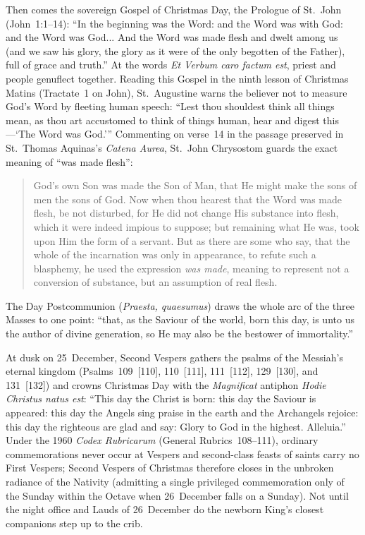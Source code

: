 Then comes the sovereign Gospel of Christmas Day, the Prologue of St.~John
(John~1:1--14): ``In the beginning was the Word: and the Word was with God: and
the Word was God... And the Word was made flesh and dwelt among us (and we saw
his glory, the glory as it were of the only begotten of the Father), full of
grace and truth.'' At the words \textit{Et Verbum caro factum est}, priest and
people genuflect together. Reading this Gospel in the ninth lesson of Christmas
Matins (Tractate~1 on John), St.~Augustine warns the believer not to measure
God's Word by fleeting human speech: ``Lest thou shouldest think all things
mean, as thou art accustomed to think of things human, hear and digest
this---`The Word was God.''' Commenting on verse~14 in the passage preserved in
St.~Thomas Aquinas's \textit{Catena Aurea}, St.~John Chrysostom guards the
exact meaning of ``was made flesh'':

\begin{quote}
God's own Son was made the Son of Man, that He might make the sons of men the
sons of God. Now when thou hearest that the Word was made flesh, be not
disturbed, for He did not change His substance into flesh, which it were indeed
impious to suppose; but remaining what He was, took upon Him the form of a
servant. But as there are some who say, that the whole of the incarnation was
only in appearance, to refute such a blasphemy, he used the expression
\textit{was made}, meaning to represent not a conversion of substance, but an
assumption of real flesh.
\end{quote}

The Day Postcommunion (\textit{Praesta, quaesumus}) draws the whole arc of the
three Masses to one point: ``that, as the Saviour of the world, born this day,
is unto us the author of divine generation, so He may also be the bestower of
immortality.''

At dusk on 25~December, Second Vespers gathers the psalms of the Messiah's
eternal kingdom (Psalms~109~[110], 110~[111], 111~[112], 129~[130], and
131~[132]) and crowns Christmas Day with the \textit{Magnificat} antiphon
\textit{Hodie Christus natus est}: ``This day the Christ is born: this day the
Saviour is appeared: this day the Angels sing praise in the earth and the
Archangels rejoice: this day the righteous are glad and say: Glory to God in the
highest. Alleluia.'' Under the 1960 \textit{Codex Rubricarum} (General
Rubrics~108--111), ordinary commemorations never occur at Vespers and
second-class feasts of saints carry no First Vespers; Second Vespers of
Christmas therefore closes in the unbroken radiance of the Nativity (admitting a
single privileged commemoration only of the Sunday within the Octave when
26~December falls on a Sunday). Not until the night office and Lauds of
26~December do the newborn King's closest companions step up to the crib.
